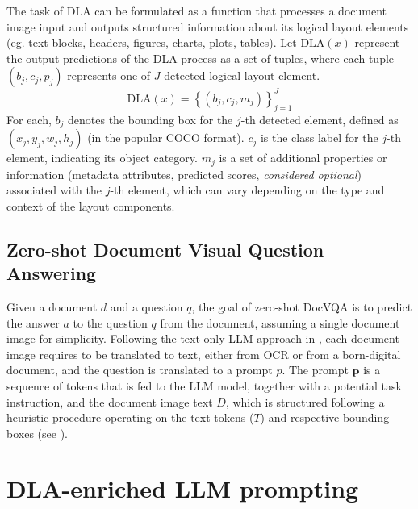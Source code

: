 The task of DLA can be formulated as a function that processes a document image input and outputs structured information about its logical layout elements (eg. text blocks, headers, figures, charts, plots, tables).
Let  $\mathrm{DLA}(x)$ represent the output predictions of the DLA process as a set of tuples, where each tuple $\left(b_j, c_j, p_j\right)$ represents one of $J$ detected logical layout element.
\begin{equation}
  \mathrm{DLA}(x)=\left\{\left(b_j, c_j, m_j\right)\right\}_{j=1}^J
\end{equation}
For each, $b_j$ denotes the bounding box for the $j$-th detected element, defined as $\left(x_j, y_j, w_j, h_j\right)$ (in the popular COCO format).
$c_j$ is the class label for the $j$-th element, indicating its object category. $m_j$ is a set of additional properties or information (metadata attributes, predicted scores, \textit{considered optional}) associated with the $j$-th element, which can vary depending on the type and context of the layout components.


\subsection{Zero-shot Document Visual Question Answering}\label{sec:supp-taskdef_docvqa}

Given a document $d$ and a question $q$, the goal of zero-shot DocVQA is to predict the answer $a$ to the question $q$ from the document, assuming a single document image for simplicity.
Following the text-only LLM approach in \cite{wang2023layout}, each document image requires to be translated to text, either from OCR or from a born-digital document, and the question is translated to a prompt $p$. The prompt $\boldsymbol{p}$ is a sequence of tokens that is fed to the LLM model, together with a potential task instruction, and the document image text $D$, which is structured following a heuristic procedure operating on the text tokens ($T$) and respective bounding boxes (see ).


\section{DLA-enriched LLM prompting}\label{sec:supp-procedure-prompt}


